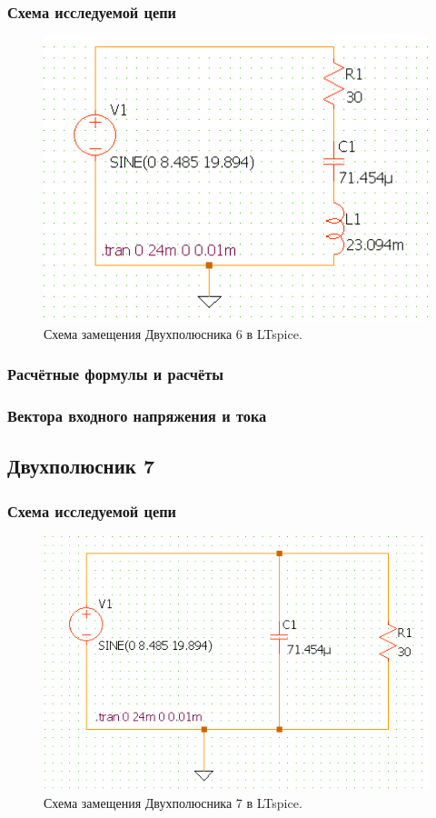 \subsubsection{Схема исследуемой цепи}
\begin{figure}[H]
	\centering
	\includegraphics[width=1\textwidth]{./data/schema6}
	\caption{Схема замещения Двухполюсника 6 в LTspice.}
\end{figure}
\subsubsection{Расчётные формулы и расчёты}

\subsubsection{Вектора входного напряжения и тока}


\subsection{Двухполюсник 7}
\subsubsection{Схема исследуемой цепи}
\begin{figure}[H]
	\centering
	\includegraphics[width=1\textwidth]{./data/schema7}
	\caption{Схема замещения Двухполюсника 7 в LTspice.}
\end{figure}
